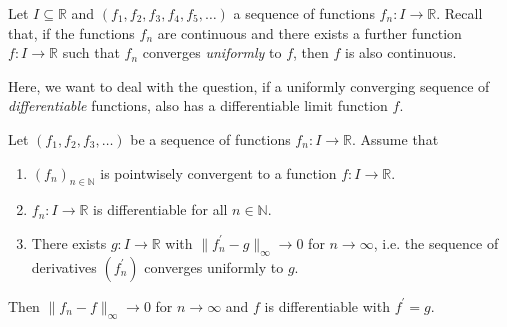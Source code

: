 
Let $I \subseteq \mathbb{R}$ and $(f_1, f_2, f_3, f_4, f_5,\dots)$ a sequence of functions $f_n \colon I \to \mathbb{R}$. 
Recall that, if the functions $f_n$ are continuous and there exists a further function $f\colon I \to \mathbb{R}$ such that $f_n$ converges \emph{uniformly} to $f$, then $f$ is also continuous.

Here, we want to deal with the question, if a uniformly converging sequence of \emph{differentiable} functions, also has a differentiable limit function $f$.

\begin{theorem}
Let $(f_1, f_2, f_3, \dots)$ be a sequence of functions $f_n \colon I \to \mathbb{R}$.
Assume that
\begin{enumerate}
\item $(f_n)_{n \in \mathbb{N}}$ is pointwisely convergent to a function $f \colon I \to \mathbb{R}$.
\item $f_n \colon I \to \mathbb{R}$ is differentiable for all $n \in \mathbb{N}$.
\item There exists $g \colon I \to \mathbb{R}$ with $\|f_n^\prime - g \|_\infty \to 0$ for $n \to \infty$, i.e. the sequence of derivatives $(f_n^\prime)$ converges uniformly to $g$.
\end{enumerate}
Then $\|f_n - f\|_\infty \to 0$ for $n \to \infty$ and $f$ is differentiable with $f^\prime = g$.
\end{theorem}

